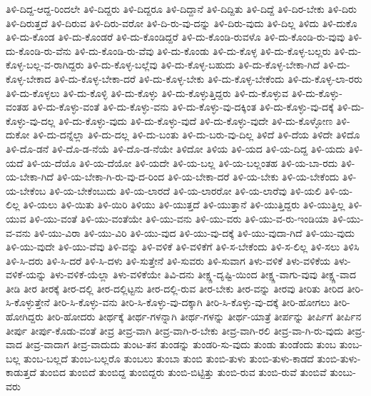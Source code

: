 {ತಿಳಿ-ದಿದ್ದ-ಆದ್ದ-ರಿಂದಲೇ
ತಿಳಿ-ದಿದ್ದರು
ತಿಳಿ-ದಿದ್ದರೂ
ತಿಳಿ-ದಿದ್ದಾನೆ
ತಿಳಿ-ದಿದ್ದಿತು
ತಿಳಿ-ದಿದ್ದೆ
ತಿಳಿ-ದಿರ-ಬೇಕು
ತಿಳಿ-ದಿರು
ತಿಳಿ-ದಿರುತ್ತದೆ
ತಿಳಿ-ದಿರುವ
ತಿಳಿ-ದಿರು-ವರೋ
ತಿಳಿ-ದಿ-ರು-ವು-ದನ್ನು
ತಿಳಿ-ದಿರು-ವುದು
ತಿಳಿ-ದಿಲ್ಲ
ತಿಳಿದು
ತಿಳಿ-ದುಕೊ
ತಿಳಿ-ದು-ಕೊಂಡ
ತಿಳಿ-ದು-ಕೊಂಡರೆ
ತಿಳಿ-ದು-ಕೊಂಡಿದ್ದರೆ
ತಿಳಿ-ದು-ಕೊಂಡಿ-ರುವಳೊ
ತಿಳಿ-ದು-ಕೊಂಡಿ-ರು-ವುವು
ತಿಳಿ-ದು-ಕೊಂಡಿ-ರು-ವೆನು
ತಿಳಿ-ದು-ಕೊಂಡಿ-ರು-ವೆವು
ತಿಳಿ-ದು-ಕೊಂಡು
ತಿಳಿ-ದು-ಕೊಳ್ಳ
ತಿಳಿ-ದು-ಕೊಳ್ಳ-ಬಲ್ಲರು
ತಿಳಿ-ದು-ಕೊಳ್ಳ-ಬಲ್ಲ-ವ-ರಾಗಿದ್ದರು
ತಿಳಿ-ದು-ಕೊಳ್ಳ-ಬಲ್ಲೆವು
ತಿಳಿ-ದು-ಕೊಳ್ಳ-ಬಹುದು
ತಿಳಿ-ದು-ಕೊಳ್ಳ-ಬೇಕಾ-ಗಿದೆ
ತಿಳಿ-ದು-ಕೊಳ್ಳ-ಬೇಕಾದ
ತಿಳಿ-ದು-ಕೊಳ್ಳ-ಬೇಕಾ-ದರೆ
ತಿಳಿ-ದು-ಕೊಳ್ಳ-ಬೇಕು
ತಿಳಿ-ದು-ಕೊಳ್ಳ-ಬೇಕೆಂದು
ತಿಳಿ-ದು-ಕೊಳ್ಳ-ಲಾ-ರರು
ತಿಳಿ-ದು-ಕೊಳ್ಳಲು
ತಿಳಿ-ದು-ಕೊಳ್ಳಿ
ತಿಳಿ-ದು-ಕೊಳ್ಳು
ತಿಳಿ-ದು-ಕೊಳ್ಳುತ್ತಿದ್ದರು
ತಿಳಿ-ದು-ಕೊಳ್ಳುವ
ತಿಳಿ-ದು-ಕೊಳ್ಳು-ವಂತಹ
ತಿಳಿ-ದು-ಕೊಳ್ಳು-ವಂತೆ
ತಿಳಿ-ದು-ಕೊಳ್ಳು-ವನು
ತಿಳಿ-ದು-ಕೊಳ್ಳು-ವು-ದಕ್ಕಿಂತ
ತಿಳಿ-ದು-ಕೊಳ್ಳು-ವು-ದಕ್ಕೆ
ತಿಳಿ-ದು-ಕೊಳ್ಳು-ವು-ದಲ್ಲ
ತಿಳಿ-ದು-ಕೊಳ್ಳು-ವುದು
ತಿಳಿ-ದು-ಕೊಳ್ಳು-ವುದೆ
ತಿಳಿ-ದು-ಕೊಳ್ಳು-ವುದೇ
ತಿಳಿ-ದು-ಕೊಳ್ಳೋಣ
ತಿಳಿ-ದುಕೋ
ತಿಳಿ-ದು-ದನ್ನೆಲ್ಲಾ
ತಿಳಿ-ದು-ದಲ್ಲ
ತಿಳಿ-ದು-ಬಂತು
ತಿಳಿ-ದು-ಬರು-ವು-ದಿಲ್ಲ
ತಿಳಿದೆ
ತಿಳಿ-ದೆಯ
ತಿಳಿದೇ
ತಿಳಿದೊ
ತಿಳಿ-ದೊ-ಡನೆ
ತಿಳಿ-ದೊ-ಡ-ನೆಯೆ
ತಿಳಿ-ದೊ-ಡ-ನೆಯೇ
ತಿಳಿದೋ
ತಿಳಿಯ
ತಿಳಿ-ಯದ
ತಿಳಿ-ಯ-ದಿದ್ದ
ತಿಳಿ-ಯದು
ತಿಳಿ-ಯದೆ
ತಿಳಿ-ಯ-ದೆಯೊ
ತಿಳಿ-ಯ-ದೆಯೋ
ತಿಳಿ-ಯದೇ
ತಿಳಿ-ಯ-ಬಲ್ಲ
ತಿಳಿ-ಯ-ಬಲ್ಲಂತಹ
ತಿಳಿ-ಯ-ಬಾ-ರದು
ತಿಳಿ-ಯ-ಬೇಕಾ-ಗಿದೆ
ತಿಳಿ-ಯ-ಬೇಕಾ-ಗಿ-ರು-ವು-ದ-ರಿಂದ
ತಿಳಿ-ಯ-ಬೇಕಾ-ದರೆ
ತಿಳಿ-ಯ-ಬೇಕು
ತಿಳಿ-ಯ-ಬೇಕೆಂದು
ತಿಳಿ-ಯ-ಬೇಕೆಂಬ
ತಿಳಿ-ಯ-ಬೇಕೆಂಬುದು
ತಿಳಿ-ಯ-ಲಾರದೆ
ತಿಳಿ-ಯ-ಲಾರರೋ
ತಿಳಿ-ಯ-ಲಾರೆವು
ತಿಳಿ-ಯಲಿ
ತಿಳಿ-ಯ-ಲಿಲ್ಲ
ತಿಳಿ-ಯಲು
ತಿಳಿ-ಯಿತು
ತಿಳಿ-ಯಿರಿ
ತಿಳಿಯು
ತಿಳಿ-ಯುತ್ತದೆ
ತಿಳಿ-ಯುತ್ತಾನೆ
ತಿಳಿ-ಯುತ್ತಿದ್ದರು
ತಿಳಿ-ಯುತ್ತಿಲ್ಲ
ತಿಳಿ-ಯುವ
ತಿಳಿ-ಯು-ವಂತೆ
ತಿಳಿ-ಯು-ವಂತೆಯೇ
ತಿಳಿ-ಯು-ವನು
ತಿಳಿ-ಯು-ವರು
ತಿಳಿ-ಯು-ವ-ರು-ಇಂಡಿಯಾ
ತಿಳಿ-ಯು-ವ-ವನು
ತಿಳಿ-ಯು-ವಿರಾ
ತಿಳಿ-ಯು-ವಿರಿ
ತಿಳಿ-ಯು-ವುದ
ತಿಳಿ-ಯು-ವು-ದಕ್ಕೆ
ತಿಳಿ-ಯು-ವುದಾ-ಗಿದೆ
ತಿಳಿ-ಯು-ವುದು
ತಿಳಿ-ಯು-ವುದೇ
ತಿಳಿ-ಯು-ವೆವು
ತಿಳಿ-ವನ್ನು
ತಿಳಿ-ವಳಿಕೆ
ತಿಳಿ-ವಳಿಕೆಗೆ
ತಿಳಿ-ಸ-ಬೇಕೆಂದು
ತಿಳಿ-ಸ-ಲಿಲ್ಲ
ತಿಳಿ-ಸಲು
ತಿಳಿಸಿ
ತಿಳಿ-ಸಿ-ದರು
ತಿಳಿ-ಸಿ-ದರೆ
ತಿಳಿ-ಸಿ-ದಳು
ತಿಳಿ-ಸುತ್ತೇನೆ
ತಿಳಿ-ಸುವರು
ತಿಳಿ-ಸುವಾಗ
ತಿಳು-ವಳಿಕೆ
ತಿಳು-ವಳಿಕೆಯ
ತಿಳು-ವಳಿಕೆ-ಯನ್ನು
ತಿಳು-ವಳಿಕೆ-ಯೆಲ್ಲಾ
ತಿಳು-ವಳಿಕೆಯೇ
ತಿವಿ-ದನು
ತೀಕ್ಷ್ಣ-ದೃಷ್ಟಿ-ಯಿಂದ
ತೀಕ್ಷ್ಣ-ವಾಗು-ವುವು
ತೀಕ್ಷ್ಣ-ವಾದ
ತೀಡಿ
ತೀರ
ತೀರಕ್ಕೆ
ತೀರ-ದಲ್ಲಿ
ತೀರ-ದಲ್ಲಿಟ್ಟನು
ತೀರ-ದಲ್ಲಿ-ರುವ
ತೀರ-ಬೇಕು
ತೀರ-ವನ್ನು
ತೀರವು
ತೀರಿತು
ತೀರಿದ
ತೀರಿ-ಸಿ-ಕೊಳ್ಳುತ್ತೇನೆ
ತೀರಿ-ಸಿ-ಕೊಳ್ಳು-ವನು
ತೀರಿ-ಸಿ-ಕೊಳ್ಳು-ವು-ದಕ್ಕಾಗಿ
ತೀರಿ-ಸಿ-ಕೊಳ್ಳು-ವು-ದಕ್ಕೆ
ತೀರಿ-ಹೋಗಲು
ತೀರಿ-ಹೋಗಿದ್ದರು
ತೀರಿ-ಹೋದರು
ತೀರ್ಥಕ್ಕೆ
ತೀರ್ಥ-ಗಳನ್ನಾಗಿ
ತೀರ್ಥ-ಗಳನ್ನು
ತೀರ್ಥ-ಯಾತ್ರೆ
ತೀರ್ಪನ್ನು
ತೀರ್ಪಿಗೆ
ತೀರ್ಪಿನ
ತೀರ್ಪು
ತೀರ್ಪು-ಕೊಡು-ವಂತೆ
ತೀವ್ರ
ತೀವ್ರ-ವಾಗಿ
ತೀವ್ರ-ವಾಗಿ-ರ-ಬೇಕು
ತೀವ್ರ-ವಾಗಿ-ರಲಿ
ತೀವ್ರ-ವಾ-ಗಿ-ರು-ವುದು
ತೀವ್ರ-ವಾದ
ತೀವ್ರ-ವಾದಾಗ
ತೀವ್ರ-ವಾದುದು
ತುಂಟ-ತನ
ತುಂಡನ್ನು
ತುಂಡರಿ-ಸು-ವುದು
ತುಂಡು
ತುಂಡೆಂದು
ತುಂಬ
ತುಂಬ-ಬಲ್ಲ
ತುಂಬ-ಬಲ್ಲದೆ
ತುಂಬ-ಬಲ್ಲರೊ
ತುಂಬಲು
ತುಂಬಾ
ತುಂಬಿ
ತುಂಬಿ-ತುಳು
ತುಂಬಿ-ತುಳು-ಕಾಡದೆ
ತುಂಬಿ-ತುಳು-ಕಾಡುತ್ತದೆ
ತುಂಬಿದ
ತುಂಬಿದೆ
ತುಂಬಿದ್ದ
ತುಂಬಿದ್ದರು
ತುಂಬಿ-ಬಿಟ್ಟಿತ್ತು
ತುಂಬಿ-ರುವ
ತುಂಬಿ-ರುವೆ
ತುಂಬಿವೆ
ತುಂಬು-ವರು
}

